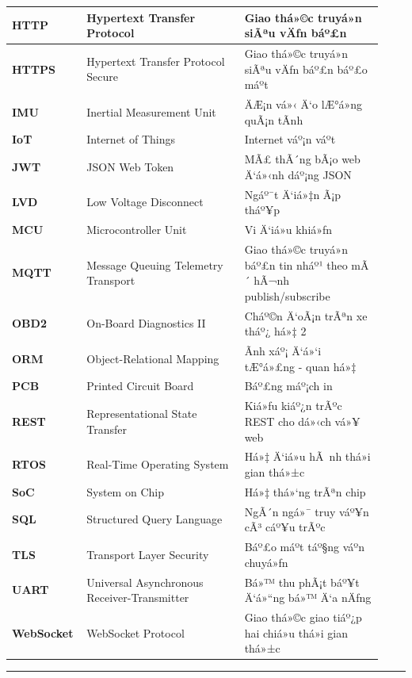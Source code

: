 \documentclass[a4paper]{extarticle}
\begin{document}
{\begin{longtable}{|L{0.160\linewidth}|L{0.410\linewidth}|L{0.360\linewidth}|}
\textbf{HTTP} & Hypertext Transfer Protocol & Giao thá»©c truyá»n siÃªu vÄƒn
báº£n \\\hline
\textbf{HTTPS} & Hypertext Transfer Protocol Secure & Giao thá»©c truyá»n
siÃªu vÄƒn báº£n báº£o máº­t \\\hline
\textbf{IMU} & Inertial Measurement Unit & ÄÆ¡n vá»‹ Ä‘o lÆ°á»ng quÃ¡n tÃ­nh \\\hline
\textbf{IoT} & Internet of Things & Internet váº¡n váº­t \\\hline
\textbf{JWT} & JSON Web Token & MÃ£ thÃ´ng bÃ¡o web Ä‘á»‹nh dáº¡ng JSON \\\hline
\textbf{LVD} & Low Voltage Disconnect & Ngáº¯t Ä‘iá»‡n Ã¡p tháº¥p \\\hline
\textbf{MCU} & Microcontroller Unit & Vi Ä‘iá»u khiá»ƒn \\\hline
\textbf{MQTT} & Message Queuing Telemetry Transport & Giao thá»©c truyá»n
báº£n tin nháº¹ theo mÃ´ hÃ¬nh publish/subscribe \\\hline
\textbf{OBD2} & On-Board Diagnostics II & Cháº©n Ä‘oÃ¡n trÃªn xe tháº¿ há»‡ 2 \\\hline
\textbf{ORM} & Object-Relational Mapping & Ãnh xáº¡ Ä‘á»‘i tÆ°á»£ng - quan há»‡ \\\hline
\textbf{PCB} & Printed Circuit Board & Báº£ng máº¡ch in \\\hline
\textbf{REST} & Representational State Transfer & Kiá»ƒu kiáº¿n trÃºc REST
cho dá»‹ch vá»¥ web \\\hline
\textbf{RTOS} & Real-Time Operating System & Há»‡ Ä‘iá»u hÃ nh thá»i gian
thá»±c \\\hline
\textbf{SoC} & System on Chip & Há»‡ thá»‘ng trÃªn chip \\\hline
\textbf{SQL} & Structured Query Language & NgÃ´n ngá»¯ truy váº¥n cÃ³ cáº¥u
trÃºc \\\hline
\textbf{TLS} & Transport Layer Security & Báº£o máº­t táº§ng váº­n chuyá»ƒn \\\hline
\textbf{UART} & Universal Asynchronous Receiver-Transmitter & Bá»™ thu
phÃ¡t báº¥t Ä‘á»“ng bá»™ Ä‘a nÄƒng \\\hline
\textbf{WebSocket} & WebSocket Protocol & Giao thá»©c giao tiáº¿p hai chiá»u
thá»i gian thá»±c \\\hline
\end{longtable}
}

\begin{center}\rule{0.5\linewidth}{0.5pt}\end{center}
\end{document}
